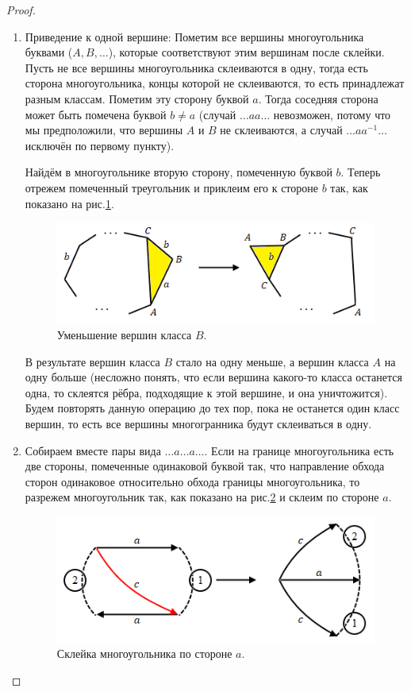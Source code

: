 \begin{proof}
\begin{enumerate}
        \item Приведение к одной вершине: 
        Пометим все вершины многоугольника буквами ($A,B, \dots$), которые соответствуют этим вершинам после склейки. Пусть не все вершины многоугольника склеиваются в одну, тогда есть сторона многоугольника, концы которой не склеиваются, то есть принадлежат разным классам. Пометим эту сторону буквой $a$. Тогда соседняя сторона может быть помечена буквой $b \neq a$ (случай $\dots aa \dots$ невозможен, потому что мы предположили, что вершины $A$ и $B$ не склеиваются, а случай $\dots aa^{-1} \dots$ исключён по первому пункту).

        Найдём в многоугольнике вторую сторону, помеченную буквой $b$. Теперь отрежем помеченный треугольник и приклеим его к стороне $b$ так, как показано на рис.\ref{fig:c10.5}.

        \begin{figure}[htbp]
            \centering
            \includegraphics[scale=0.7]{images/c10.5.png}
            \caption{Уменьшение вершин класса $B$.}
            \label{fig:c10.5}
        \end{figure}

        В результате вершин класса $B$ стало на одну меньше, а вершин класса $A$ на одну больше (несложно понять, что если вершина какого-то класса останется одна, то склеятся рёбра, подходящие к этой вершине, и она уничтожится). Будем повторять данную операцию до тех пор, пока не останется один класс вершин, то есть все вершины многогранника будут склеиваться в одну.

        \item Собираем вместе пары вида $\dots a \dots a \dots$. Если на границе многоугольника есть две стороны, помеченные одинаковой буквой так, что направление обхода сторон одинаковое относительно обхода границы многоугольника, то разрежем многоугольник так, как показано на рис.\ref{fig:c10.6} и склеим по стороне $a$.
        
        \begin{figure}[htbp]
            \centering
            \includegraphics[scale=0.7]{images/c10.6.png}
            \caption{Склейка многоугольника по стороне $a$.}
            \label{fig:c10.6}
        \end{figure}


\end{enumerate}
\end{proof}
